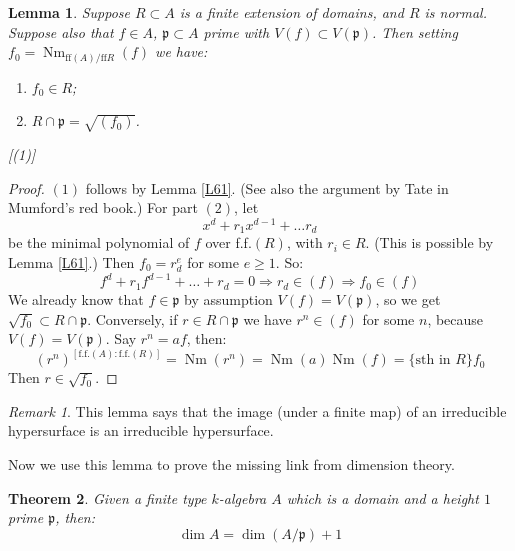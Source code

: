 \documentclass{article}
\newcommand{\fr}{\mathfrak}
\DeclareMathOperator{\Nm}{Nm}
\theoremstyle{plain}
\newtheorem{thm}{Theorem}
\newtheorem{lem}[thm]{Lemma}
\theoremstyle{definition}
\theoremstyle{remark}
\newtheorem*{rem}{Remark}
\begin{document}
\begin{lem}
\label{L62}
Suppose $R\subset A$ is a finite extension of domains, and $R$ is normal. Suppose also that $f\in A$, $\fr p \subset A$ prime with $V(f) \subset V(\fr p)$. Then setting $f_0 = \Nm_{\text{ff}(A)/\text{ff}R} (f)$ we have:
\begin{enumerate}
\item $f_0 \in R$;
\item $R \cap \fr p = \sqrt{(f_0)}$.
\end{enumerate} [(1)]
\end{lem}
\begin{proof}
$(1)$ follows by Lemma \ref{L61}. (See also the argument by Tate in Mumford's red book.) For part $(2)$, let
\[    x^d + r_1 x^{d-1} + \dots r_d    \]
be the minimal polynomial of $f$ over f.f.$(R)$, with $r_i \in R$. (This is possible by Lemma \ref{L61}.) Then $f_0 = r_d^e$ for some $e\geq 1$. So:
\[     f^d + r_1 f^{d-1} + \dots + r_d = 0   \Rightarrow r_d \in (f) \Rightarrow f_0 \in (f)   \]
We already know that $f \in \fr p$ by assumption $V(f) = V(\fr p)$, so we get $\sqrt{f_0} \subset R \cap \fr p$. Conversely, if $r \in R \cap \fr p$ we have $r^n\in (f)$ for some $n$, because $V(f) = V(\fr p)$. Say $r^n = af$, then:
\[         (r^n)^{[\text{f.f.}(A) : \text{f.f.}(R)]} = \Nm (r^n) = \Nm(a) \Nm(f) = \{\text{sth in }R\} f_0       \]
Then $r \in \sqrt{f_0}$.
\end{proof}
\begin{rem}
This lemma says that the image (under a finite map) of an irreducible hypersurface is an irreducible hypersurface.
\end{rem}
Now we use this lemma to prove the missing link from dimension theory.
\begin{thm}
\label{L63}
Given a finite type $k$-algebra $A$ which is a domain and a height $1$ prime $\fr p$, then:
\[       \dim A = \dim(A/\fr p) + 1   \]
\end{thm}
\end{document}
